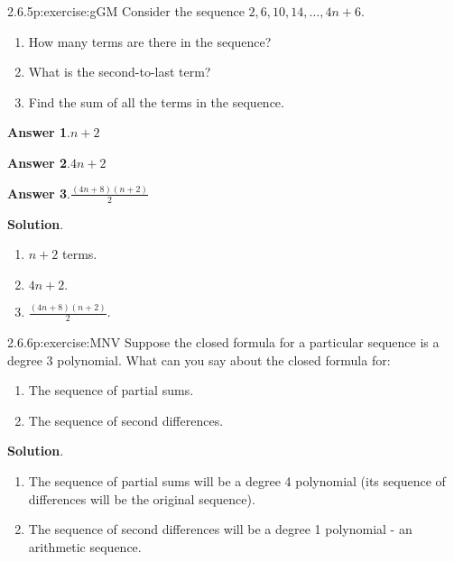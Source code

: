 \documentclass[twoside,11pt,]{book}
\newcommand{\blocktitlefont}{\relax}
\numberwithin{equation}{chapter}
\begin{document}
\begin{divisionsolution}{2.6.5}{}{p:exercise:gGM}%
Consider the sequence \(2, 6, 10, 14, \ldots, 4n + 6\text{.}\)%
\begin{enumerate}[label=(\alph*)]
\item{}How many terms are there in the sequence?%
\item{}What is the second-to-last term?%
\item{}Find the sum of all the terms in the sequence.%
\end{enumerate}
%
\par\smallskip%
\noindent\textbf{\blocktitlefont Answer 1}.\quad{}\(n+2\)%
\par\smallskip%
\noindent\textbf{\blocktitlefont Answer 2}.\quad{}\(4n+2\)%
\par\smallskip%
\noindent\textbf{\blocktitlefont Answer 3}.\quad{}\(\frac{\left(4n+8\right)\!\left(n+2\right)}{2}\)%
\par\smallskip%
\noindent\textbf{\blocktitlefont Solution}.\quad{}%
\begin{enumerate}[label=(\alph*)]
\item{}\(n+2\) terms.%
\item{}\(4n+2\text{.}\)%
\item{}\(\frac{(4n+8)(n+2)}{2}\text{.}\)%
\end{enumerate}
%
\end{divisionsolution}%
\begin{divisionsolution}{2.6.6}{}{p:exercise:MNV}%
Suppose the closed formula for a particular sequence is a degree 3 polynomial. What can you say about the closed formula for:%
\begin{enumerate}[label=(\alph*)]
\item{}The sequence of partial sums.%
\item{}The sequence of second differences.%
\end{enumerate}
%
\par\smallskip%
\noindent\textbf{\blocktitlefont Solution}.\quad{}%
\begin{enumerate}[label=(\alph*)]
\item{}The sequence of partial sums will be a degree 4 polynomial (its sequence of differences will be the original sequence).%
\item{}The sequence of second differences will be a degree 1 polynomial - an arithmetic sequence.%
\end{enumerate}
%
\end{divisionsolution}%
\end{document}
